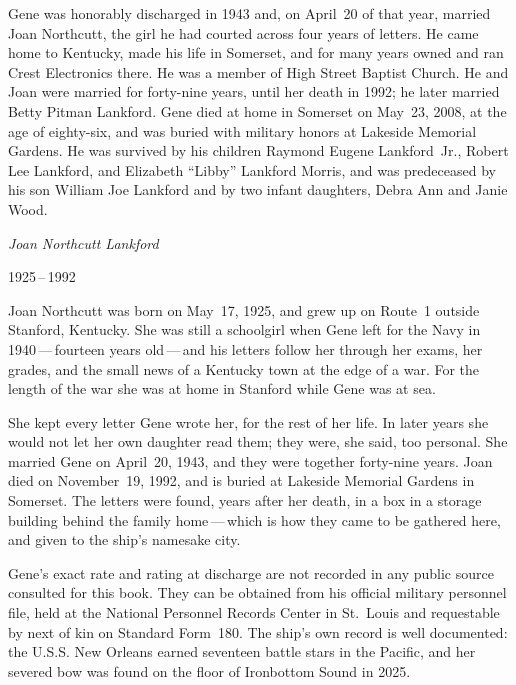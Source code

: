 \par
Gene was honorably discharged in 1943 and, on April~20 of that year, married
Joan Northcutt, the girl he had courted across four years of letters. He came
home to Kentucky, made his life in Somerset, and for many years owned and ran
Crest Electronics there. He was a member of High Street Baptist Church. He and
Joan were married for forty-nine years, until her death in 1992; he later
married Betty Pitman Lankford. Gene died at home in Somerset on May~23, 2008,
at the age of eighty-six, and was buried with military honors at Lakeside
Memorial Gardens. He was survived by his children Raymond Eugene Lankford~Jr.,
Robert Lee Lankford, and Elizabeth ``Libby'' Lankford Morris, and was
predeceased by his son William Joe Lankford and by two infant daughters,
Debra Ann and Janie Wood.

\vspace{2em}
\begin{center}
    {\Large\displayfont\itshape Joan Northcutt Lankford\par}
    {\monofont\small{}\color{walnutmute}1925\,--\,1992}
\end{center}
\vspace{1.4em}

\noindent
Joan Northcutt was born on May~17, 1925, and grew up on Route~1 outside
Stanford, Kentucky. She was still a schoolgirl when Gene left for the Navy in
1940\,---\,fourteen years old\,---\,and his letters follow her through her
exams, her grades, and the small news of a Kentucky town at the edge of a war.
For the length of the war she was at home in Stanford while Gene was at sea.

\par
She kept every letter Gene wrote her, for the rest of her life. In later years
she would not let her own daughter read them; they were, she said, too
personal. She married Gene on April~20, 1943, and they were together
forty-nine years. Joan died on November~19, 1992, and is buried at Lakeside
Memorial Gardens in Somerset. The letters were found, years after her death, in
a box in a storage building behind the family home\,---\,which is how they came
to be gathered here, and given to the ship's namesake city.

\vspace{2em}
\begin{center}
    \par
    \vspace{0.3em}
    \brassrule[22pt]\par
\end{center}
\vspace{1em}

\noindent
Gene's exact rate and rating at discharge are not recorded in any public
source consulted for this book. They can be obtained from his official
military personnel file, held at the National Personnel Records Center in
St.~Louis and requestable by next of kin on Standard Form~180. The ship's own
record is well documented: the U.S.S. New Orleans earned seventeen battle
stars in the Pacific, and her severed bow was found on the floor of Ironbottom
Sound in 2025.
\vfill
